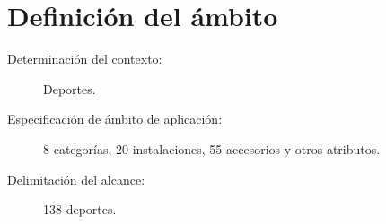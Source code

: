 \chapter{Definición del ámbito}
 \begin{description}
  \item [Determinación del contexto:] Deportes.
  \item [Especificación de ámbito de aplicación:] 8 categorías, 20 instalaciones, 55 accesorios y otros atributos.
  \item [Delimitación del alcance:] 138 deportes.
 \end{description}
 